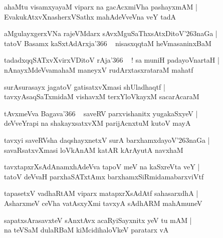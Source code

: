 \documentclass[twoside,12pt,openright]{book}
\def\S{\char'263}
\newcounter{shloka}[chapter]
\begin{document}
\begin{shloka}
ahaMtu visamxyayaM viparx na gacAcxmiVha pashayxmAM |\\
EvakukAtxvXnasherxVSathx mahAdeVveVna veY tadA
\end{shloka}

\begin{shloka}
aMgulayxgerxVNa rajeVMdarx sAvxMguSaThxsAtxDitoV\S naGa |\\
tatoV Basamx kaSxtAdArxja\char'366 ~ nisasxqqtaM heVmasaninxBaM 
\end{shloka}

\begin{shloka}
tadadxqqSATxvXvirxVDitoV rAja\char'366 ~ ! sa muniH padayoVnartaH |\\
nAnayxMdeVvamahaM maneyxV rudArxtasxrataraM mahatf 
\end{shloka}

\begin{shloka}
surAsurasayx jagatoV gatisatxvXmasi shUladhaqtf |\\
tavxyAsaqSaTxmidaM vishavxM terxYloVkayxM sacarAcaraM 
\end{shloka}

\begin{shloka}
tAvxmeVva Bagava\char'366 ~ saveRV parxvishanitx yugakaSxyeV |\\
deVveYrapi na shakayxsatxvXM parijAcnxtuM kutoV mayA
\end{shloka}

\begin{shloka}
tavxyi saveRVsha daqshayxnetxV surA barxhamxdayoV\S naGa |\\
savaRsatxvXmasi loVkAnAM katAR kArAyutA navxhaM 
\end{shloka}

\begin{shloka}
tavxtapxrXsAdAnamxhAdeVva tapoV meV na kaSxreVta veY |\\
tatoV deVvaH parxhaSATxtAmx barxhamxSiRmidamabarxviVtf 
\end{shloka}

\begin{shloka}
tapasetxV vadhaRtAM viparx matapxrXsAdAtf sahasarxdhA |\\
AsharxmeV ceVha vatAsxyXmi tavxyA sAdhARM mahAmuneV 
\end{shloka}

\begin{shloka}
sapatxsArasavxteV sAnxtAvx acaRyiSayxnitx  yeV tu mAM |\\
na teVSaM dulaRBaM kiMcidihaloVkeV paratarx vA
\end{shloka}
\end{document}
